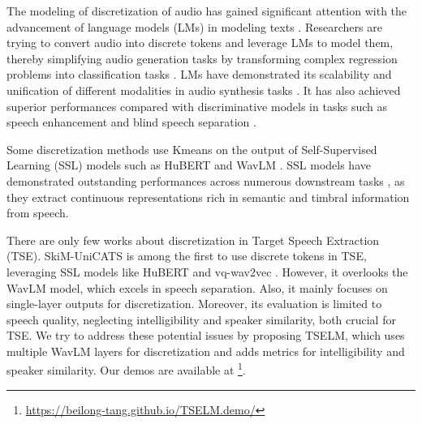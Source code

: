 \documentclass[conference]{IEEEtran}
\begin{document}
The modeling of discretization of audio has gained significant attention with the advancement of language models (LMs) in modeling texts \cite{l1, l2, l3, l4, l5}. Researchers are trying to convert audio into discrete tokens and leverage LMs to 
model them, thereby simplifying audio generation tasks by transforming complex regression problems into classification tasks \cite{dasb}.
LMs have demonstrated its scalability and unification of different modalities in audio synthesis tasks \cite{audio_gen,deshmukh2023pengi,chen2023lauragpt}. It has also achieved superior performances compared with discriminative models in
tasks such as speech enhancement \cite{selm,mask_sr} and blind speech separation \cite{dasb,tokensplit}.

Some discretization methods \cite{selm,tokensplit,dasb} use Kmeans on the output of Self-Supervised Learning (SSL) models such as HuBERT \cite{hubert} and WavLM \cite{wavlm}. SSL models have demonstrated outstanding performances across numerous downstream tasks \cite{superb}, as they extract continuous representations rich in semantic and timbral information from speech.

There are only few works about discretization in Target Speech Extraction (TSE). SkiM-UniCATS \cite{gen_tse} is among the first to use discrete tokens in TSE, leveraging SSL models like HuBERT and vq-wav2vec \cite{vq_wav2vec}. However, it overlooks the WavLM model, which excels in speech separation. Also, it mainly focuses on single-layer outputs for discretization. Moreover, its evaluation is limited to speech quality, neglecting intelligibility and speaker similarity, both crucial for TSE. We try to address these potential issues by proposing TSELM, which uses multiple WavLM layers for discretization and adds metrics for intelligibility and speaker similarity. Our demos are available at 
\footnote{\href{https://beilong-tang.github.io/TSELM.demo/}{https://beilong-tang.github.io/TSELM.demo/}}.
\end{document}

